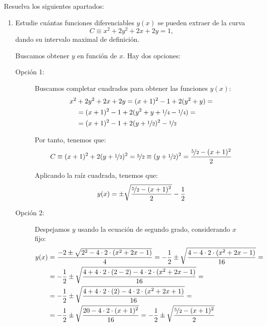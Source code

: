 \begin{ejercicio} Resuelva los siguientes apartados:
    \begin{enumerate}
        \item Estudie cuántas funciones diferenciables \(y(x)\) se pueden extraer de la curva
        \begin{equation*}
            C \equiv x^2 + 2y^2 + 2x + 2y = 1,
        \end{equation*}
        dando su intervalo maximal de definición.

        Buscamos obtener $y$ en función de $x$. Hay dos opciones:
        \begin{description}
            \item[Opción 1:] Buscamos completar cuadrados para obtener las funciones $y(x)$:
            \begin{align*}
                x^2 &+ 2y^2 + 2x + 2y = (x+1)^2 -1 + 2(y^2+y)
                =\\&= (x+1)^2 -1+ 2(y^2+y+\nicefrac{1}{4} - \nicefrac{1}{4})
                =\\&= (x+1)^2 -1+ 2(y+\nicefrac{1}{2})^2 - \nicefrac{1}{2}
            \end{align*}
            
            Por tanto, tenemos que:
            \begin{equation*}
                C\equiv (x+1)^2 + 2(y+\nicefrac{1}{2})^2 = \nicefrac{5}{2}
                \equiv (y+\nicefrac{1}{2})^2 = \dfrac{\nicefrac{5}{2} - (x+1)^2}{2}
            \end{equation*}
    
            Aplicando la raíz cuadrada, tenemos que:
            \begin{equation*}
                y(x) = \pm \sqrt{\dfrac{\nicefrac{5}{2} - (x+1)^2}{2}} - \frac{1}{2}
            \end{equation*}

            \item[Opción 2:] Despejamos $y$ usando la ecuación de segundo grado, considerando $x$ fijo:
            \begin{align*}
                y(x)&= \dfrac{-2\pm \sqrt{2^2 - 4\cdot 2\cdot (x^2+2x-1)}}{4}
                = -\frac{1}{2} \pm \sqrt{\dfrac{4 - 4\cdot 2\cdot (x^2+2x-1)}{16}}
                =\\&= -\frac{1}{2} \pm \sqrt{\dfrac{4 +4\cdot 2\cdot (2-2)- 4\cdot 2\cdot (x^2+2x-1)}{16}}
                =\\&= -\frac{1}{2} \pm \sqrt{\dfrac{4 +4\cdot 2\cdot (2)- 4\cdot 2\cdot (x^2+2x+1)}{16}}
                =\\&= -\frac{1}{2} \pm \sqrt{\dfrac{20- 4\cdot 2\cdot (x+1)^2}{16}}
                =-\frac{1}{2} \pm \sqrt{\dfrac{\nicefrac{5}{2}- (x+1)^2}{2}}
            \end{align*}
        \end{description}


\end{enumerate}
\end{ejercicio}
